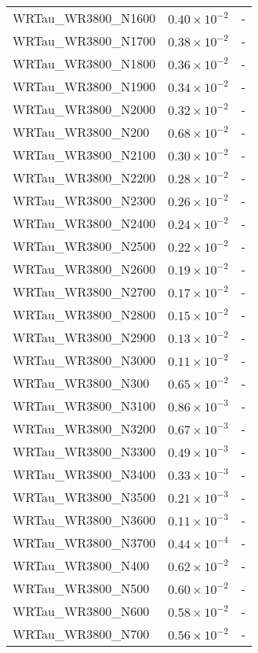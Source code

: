 \begin{longtable}[c]{| C{.35\textwidth} | C{.15\textwidth} | C{.1\textwidth}|}
    WRTau\_WR3800\_N1600 & $0.40\times10^{-2}$ & - \\
    WRTau\_WR3800\_N1700 & $0.38\times10^{-2}$ & - \\
    WRTau\_WR3800\_N1800 & $0.36\times10^{-2}$ & - \\
    WRTau\_WR3800\_N1900 & $0.34\times10^{-2}$ & - \\
    WRTau\_WR3800\_N2000 & $0.32\times10^{-2}$ & - \\
    WRTau\_WR3800\_N200 & $0.68\times10^{-2}$ & - \\
    WRTau\_WR3800\_N2100 & $0.30\times10^{-2}$ & - \\
    WRTau\_WR3800\_N2200 & $0.28\times10^{-2}$ & - \\
    WRTau\_WR3800\_N2300 & $0.26\times10^{-2}$ & - \\
    WRTau\_WR3800\_N2400 & $0.24\times10^{-2}$ & - \\
    WRTau\_WR3800\_N2500 & $0.22\times10^{-2}$ & - \\
    WRTau\_WR3800\_N2600 & $0.19\times10^{-2}$ & - \\
    WRTau\_WR3800\_N2700 & $0.17\times10^{-2}$ & - \\
    WRTau\_WR3800\_N2800 & $0.15\times10^{-2}$ & - \\
    WRTau\_WR3800\_N2900 & $0.13\times10^{-2}$ & - \\
    WRTau\_WR3800\_N3000 & $0.11\times10^{-2}$ & - \\
    WRTau\_WR3800\_N300 & $0.65\times10^{-2}$ & - \\
    WRTau\_WR3800\_N3100 & $0.86\times10^{-3}$ & - \\
    WRTau\_WR3800\_N3200 & $0.67\times10^{-3}$ & - \\
    WRTau\_WR3800\_N3300 & $0.49\times10^{-3}$ & - \\
    WRTau\_WR3800\_N3400 & $0.33\times10^{-3}$ & - \\
    WRTau\_WR3800\_N3500 & $0.21\times10^{-3}$ & - \\
    WRTau\_WR3800\_N3600 & $0.11\times10^{-3}$ & - \\
    WRTau\_WR3800\_N3700 & $0.44\times10^{-4}$ & - \\
    WRTau\_WR3800\_N400 & $0.62\times10^{-2}$ & - \\
    WRTau\_WR3800\_N500 & $0.60\times10^{-2}$ & - \\
    WRTau\_WR3800\_N600 & $0.58\times10^{-2}$ & - \\
    WRTau\_WR3800\_N700 & $0.56\times10^{-2}$ & - \\

\end{longtable}
